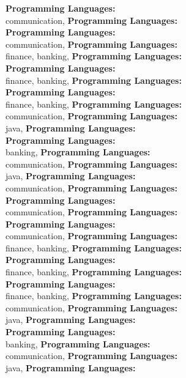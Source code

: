 \textbf{Programming Languages:} \\
communication, \textbf{Programming Languages:} \\
\textbf{Programming Languages:} \\
communication, \textbf{Programming Languages:} \\
finance, banking, \textbf{Programming Languages:} \\
\textbf{Programming Languages:} \\
finance, banking, \textbf{Programming Languages:} \\
\textbf{Programming Languages:} \\
finance, banking, \textbf{Programming Languages:} \\
communication, \textbf{Programming Languages:} \\
java, \textbf{Programming Languages:} \\
\textbf{Programming Languages:} \\
banking, \textbf{Programming Languages:} \\
communication, \textbf{Programming Languages:} \\
java, \textbf{Programming Languages:} \\
communication, \textbf{Programming Languages:} \\
\textbf{Programming Languages:} \\
communication, \textbf{Programming Languages:} \\
\textbf{Programming Languages:} \\
communication, \textbf{Programming Languages:} \\
finance, banking, \textbf{Programming Languages:} \\
\textbf{Programming Languages:} \\
finance, banking, \textbf{Programming Languages:} \\
\textbf{Programming Languages:} \\
finance, banking, \textbf{Programming Languages:} \\
communication, \textbf{Programming Languages:} \\
java, \textbf{Programming Languages:} \\
\textbf{Programming Languages:} \\
banking, \textbf{Programming Languages:} \\
communication, \textbf{Programming Languages:} \\
java, \textbf{Programming Languages:} \\
